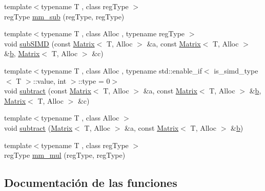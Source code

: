 \begin{DoxyCompactItemize}
{\footnotesize template$<$typename T , class reg\+Type $>$ }\\reg\+Type \hyperlink{namespaceanpi_1_1simd_a666e87726d6f06b283cf78e9635e0158}{mm\+\_\+sub} (reg\+Type, reg\+Type)
\item 
{\footnotesize template$<$typename T , class Alloc , typename reg\+Type $>$ }\\void \hyperlink{namespaceanpi_1_1simd_a6637f725450fe3bbc39506a28152264f}{sub\+S\+I\+MD} (const \hyperlink{classanpi_1_1Matrix}{Matrix}$<$ T, Alloc $>$ \&a, const \hyperlink{classanpi_1_1Matrix}{Matrix}$<$ T, Alloc $>$ \&\hyperlink{program__options_8cpp_a03799bd905ea96cd38435410694bf05b}{b}, \hyperlink{classanpi_1_1Matrix}{Matrix}$<$ T, Alloc $>$ \&c)
\item 
{\footnotesize template$<$typename T , class Alloc , typename std\+::enable\+\_\+if$<$ is\+\_\+simd\+\_\+type$<$ T $>$\+::value, int $>$\+::type  = 0$>$ }\\void \hyperlink{namespaceanpi_1_1simd_a78848ed9be16434f4e6ee7ca6f56f14d}{subtract} (const \hyperlink{classanpi_1_1Matrix}{Matrix}$<$ T, Alloc $>$ \&a, const \hyperlink{classanpi_1_1Matrix}{Matrix}$<$ T, Alloc $>$ \&\hyperlink{program__options_8cpp_a03799bd905ea96cd38435410694bf05b}{b}, \hyperlink{classanpi_1_1Matrix}{Matrix}$<$ T, Alloc $>$ \&c)
\item 
{\footnotesize template$<$typename T , class Alloc $>$ }\\void \hyperlink{namespaceanpi_1_1simd_a623f6cf02845caed74338093e0162ef9}{subtract} (\hyperlink{classanpi_1_1Matrix}{Matrix}$<$ T, Alloc $>$ \&a, const \hyperlink{classanpi_1_1Matrix}{Matrix}$<$ T, Alloc $>$ \&\hyperlink{program__options_8cpp_a03799bd905ea96cd38435410694bf05b}{b})
\item 
{\footnotesize template$<$typename T , class reg\+Type $>$ }\\reg\+Type \hyperlink{namespaceanpi_1_1simd_aa7ebdb38c8e4fc5fa991bba556974de5}{mm\+\_\+mul} (reg\+Type, reg\+Type)
\end{DoxyCompactItemize}


\subsection{Documentación de las funciones}
\mbox{\label{namespaceanpi_1_1simd_ae4ef1d42aea6476578a669fb8c7109a1}} 
